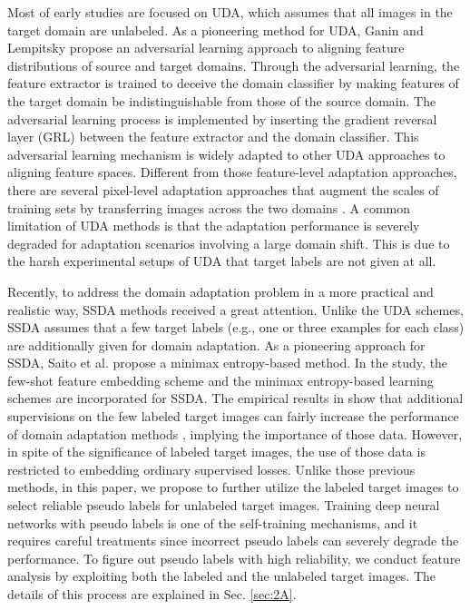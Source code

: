 \documentclass[a4paper,conference]{IEEEtran}
\begin{document}
Most of early studies are focused on UDA, which assumes that all images in the target domain are unlabeled. As a pioneering method for UDA, Ganin and Lempitsky \cite{ganin2015dann} propose an adversarial learning approach to aligning feature distributions of source and target domains. Through the adversarial learning, the feature extractor is trained to deceive the domain classifier by making features of the target domain be indistinguishable from those of the source domain. The adversarial learning process is implemented by inserting the gradient reversal layer (GRL) between the feature extractor and the domain classifier. This adversarial learning mechanism is widely adapted to other UDA approaches \cite{long2018cdan, saito2018mcd, french2018se, kurmi2018attention, ma2019gcan, choi2019pseudo} to aligning feature spaces. Different from those feature-level adaptation approaches, there are several pixel-level adaptation approaches that augment the scales of training sets by transferring images across the two domains \cite{volpi2018gan, hu2018duplex, gong2019dlow}. A common limitation of UDA methods is that the adaptation performance is severely degraded for adaptation scenarios involving a large domain shift. This is due to the harsh experimental setups of UDA that target labels are not given at all.





Recently, to address the domain adaptation problem in a more practical and realistic way, SSDA methods received a great attention. Unlike the UDA schemes, SSDA assumes that a few target labels (e.g., one or three examples for each class) are additionally given for domain adaptation. As a pioneering approach for SSDA, Saito et al. \cite{saito2019mme} propose a minimax entropy-based method. In the study, the few-shot feature embedding scheme \cite{chen2019closer} and the minimax entropy-based learning schemes are incorporated for SSDA. The empirical results in \cite{saito2019mme} show that additional supervisions on the few labeled target images can fairly increase the performance of domain adaptation methods \cite{saito2019mme, saito2017adversarial, ganin2015dann, long2018cdan, grandvalet2005semi}, implying the importance of those data. However, in spite of the significance of labeled target images, the use of those data is restricted to embedding ordinary supervised losses. Unlike those previous methods, in this paper, we propose to further utilize the labeled target images to select reliable pseudo labels for unlabeled target images. Training deep neural networks with pseudo labels \cite{lee2013pseudo} is one of the self-training mechanisms, and it requires careful treatments since incorrect pseudo labels can severely degrade the performance. To figure out pseudo labels with high reliability, we conduct feature analysis by exploiting both the labeled and the unlabeled target images. The details of this process are explained in Sec. \ref{sec:2A}.
\end{document}
